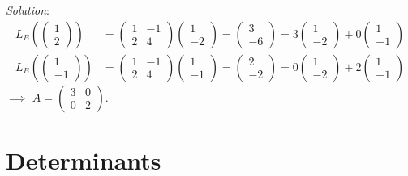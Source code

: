 \documentclass[
  12pt,
  a4paper,
  twoside]{article}
\theoremstyle{plain}
\theoremstyle{definition}
\begin{document}
\emph{Solution}:
\begin{align*}
L_{B} \left( \begin{pmatrix} 1 \\ 2 \end{pmatrix} \right) &= \begin{pmatrix} 1 & -1 \\ 2 & 4 \end{pmatrix} \begin{pmatrix} 1 \\ -2 \end{pmatrix} = \begin{pmatrix} 3 \\ -6 \end{pmatrix} = 3 \begin{pmatrix} 1 \\ -2 \end{pmatrix} + 0 \begin{pmatrix} 1 \\ -1 \end{pmatrix}\\
L_{B} \left( \begin{pmatrix} 1 \\ -1 \end{pmatrix} \right) &= \begin{pmatrix} 1 & -1 \\ 2 & 4 \end{pmatrix} \begin{pmatrix} 1 \\ -1 \end{pmatrix} = \begin{pmatrix} 2 \\ -2 \end{pmatrix} = 0 \begin{pmatrix} 1 \\ -2 \end{pmatrix} + 2 \begin{pmatrix} 1 \\ -1 \end{pmatrix}
\end{align*}
\(\implies\) \(A = \begin{pmatrix} 3 & 0 \\ 0 & 2 \end{pmatrix}\).

\newpage

\hypertarget{det}{%
\section{Determinants}\label{det}}
\end{document}
